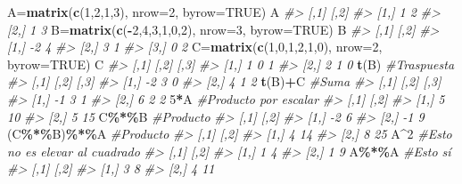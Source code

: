 \documentclass[
]{book}
\newenvironment{Shaded}{\begin{snugshade}}{\end{snugshade}}
\newcommand{\CommentTok}[1]{\textcolor[rgb]{0.56,0.35,0.01}{\textit{#1}}}
\newcommand{\DataTypeTok}[1]{\textcolor[rgb]{0.13,0.29,0.53}{#1}}
\newcommand{\DecValTok}[1]{\textcolor[rgb]{0.00,0.00,0.81}{#1}}
\newcommand{\KeywordTok}[1]{\textcolor[rgb]{0.13,0.29,0.53}{\textbf{#1}}}
\newcommand{\NormalTok}[1]{#1}
\newcommand{\OperatorTok}[1]{\textcolor[rgb]{0.81,0.36,0.00}{\textbf{#1}}}
\newcommand{\OtherTok}[1]{\textcolor[rgb]{0.56,0.35,0.01}{#1}}
\theoremstyle{definition}
\theoremstyle{definition}
\theoremstyle{definition}
\theoremstyle{remark}
\begin{document}
\begin{Shaded}
\begin{Highlighting}[]
\NormalTok{A=}\KeywordTok{matrix}\NormalTok{(}\KeywordTok{c}\NormalTok{(}\DecValTok{1}\NormalTok{,}\DecValTok{2}\NormalTok{,}\DecValTok{1}\NormalTok{,}\DecValTok{3}\NormalTok{), }\DataTypeTok{nrow=}\DecValTok{2}\NormalTok{, }\DataTypeTok{byrow=}\OtherTok{TRUE}\NormalTok{)}
\NormalTok{A}
\CommentTok{\#\textgreater{}      [,1] [,2]}
\CommentTok{\#\textgreater{} [1,]    1    2}
\CommentTok{\#\textgreater{} [2,]    1    3}
\NormalTok{B=}\KeywordTok{matrix}\NormalTok{(}\KeywordTok{c}\NormalTok{(}\OperatorTok{{-}}\DecValTok{2}\NormalTok{,}\DecValTok{4}\NormalTok{,}\DecValTok{3}\NormalTok{,}\DecValTok{1}\NormalTok{,}\DecValTok{0}\NormalTok{,}\DecValTok{2}\NormalTok{), }\DataTypeTok{nrow=}\DecValTok{3}\NormalTok{, }\DataTypeTok{byrow=}\OtherTok{TRUE}\NormalTok{)}
\NormalTok{B}
\CommentTok{\#\textgreater{}      [,1] [,2]}
\CommentTok{\#\textgreater{} [1,]   {-}2    4}
\CommentTok{\#\textgreater{} [2,]    3    1}
\CommentTok{\#\textgreater{} [3,]    0    2}
\NormalTok{C=}\KeywordTok{matrix}\NormalTok{(}\KeywordTok{c}\NormalTok{(}\DecValTok{1}\NormalTok{,}\DecValTok{0}\NormalTok{,}\DecValTok{1}\NormalTok{,}\DecValTok{2}\NormalTok{,}\DecValTok{1}\NormalTok{,}\DecValTok{0}\NormalTok{), }\DataTypeTok{nrow=}\DecValTok{2}\NormalTok{, }\DataTypeTok{byrow=}\OtherTok{TRUE}\NormalTok{)}
\NormalTok{C}
\CommentTok{\#\textgreater{}      [,1] [,2] [,3]}
\CommentTok{\#\textgreater{} [1,]    1    0    1}
\CommentTok{\#\textgreater{} [2,]    2    1    0}
\KeywordTok{t}\NormalTok{(B) }\CommentTok{\#Traspuesta}
\CommentTok{\#\textgreater{}      [,1] [,2] [,3]}
\CommentTok{\#\textgreater{} [1,]   {-}2    3    0}
\CommentTok{\#\textgreater{} [2,]    4    1    2}
\KeywordTok{t}\NormalTok{(B)}\OperatorTok{+}\NormalTok{C }\CommentTok{\#Suma}
\CommentTok{\#\textgreater{}      [,1] [,2] [,3]}
\CommentTok{\#\textgreater{} [1,]   {-}1    3    1}
\CommentTok{\#\textgreater{} [2,]    6    2    2}
\DecValTok{5}\OperatorTok{*}\NormalTok{A }\CommentTok{\#Producto por escalar}
\CommentTok{\#\textgreater{}      [,1] [,2]}
\CommentTok{\#\textgreater{} [1,]    5   10}
\CommentTok{\#\textgreater{} [2,]    5   15}
\NormalTok{C}\OperatorTok{\%*\%}\NormalTok{B }\CommentTok{\#Producto}
\CommentTok{\#\textgreater{}      [,1] [,2]}
\CommentTok{\#\textgreater{} [1,]   {-}2    6}
\CommentTok{\#\textgreater{} [2,]   {-}1    9}
\NormalTok{(C}\OperatorTok{\%*\%}\NormalTok{B)}\OperatorTok{\%*\%}\NormalTok{A }\CommentTok{\#Producto }
\CommentTok{\#\textgreater{}      [,1] [,2]}
\CommentTok{\#\textgreater{} [1,]    4   14}
\CommentTok{\#\textgreater{} [2,]    8   25}
\NormalTok{A}\OperatorTok{\^{}}\DecValTok{2} \CommentTok{\#Esto no es elevar al cuadrado}
\CommentTok{\#\textgreater{}      [,1] [,2]}
\CommentTok{\#\textgreater{} [1,]    1    4}
\CommentTok{\#\textgreater{} [2,]    1    9}
\NormalTok{A}\OperatorTok{\%*\%}\NormalTok{A  }\CommentTok{\#Esto sí}
\CommentTok{\#\textgreater{}      [,1] [,2]}
\CommentTok{\#\textgreater{} [1,]    3    8}
\CommentTok{\#\textgreater{} [2,]    4   11}
\end{Highlighting}
\end{Shaded}
\end{document}
